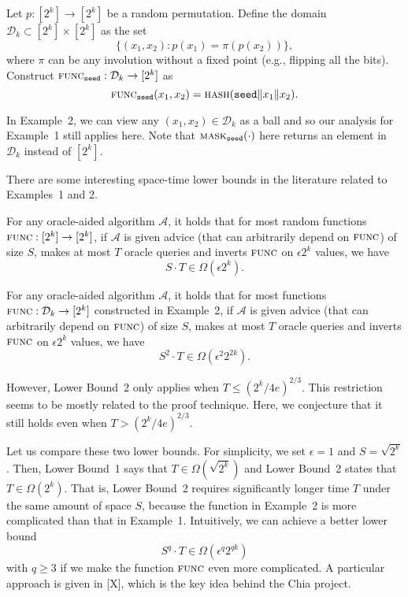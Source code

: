 \documentclass[12pt, onecolumn]{IEEEtran}
\newcommand{\seed}{\texttt{seed}}
\newcommand{\mask}{\textsc{mask}}
\newcommand{\func}{\textsc{func}}
\newcommand{\hash}{\textsc{hash}}
\begin{document}

 Let $p: [2^k] \to [2^k]$ be a random permutation. Define the domain $\mathcal{D}_k \subset [2^k] \times [2^k]$ as the set 
\[
\{ (x_1, x_2) : p(x_1) = \pi\left( p(x_2) \right) \},
\]
where $\pi$ can be any involution without a fixed point (e.g., flipping all the bits).
Construct $\func_{\seed}: \mathcal{D}_k \to [2^k]$ as 
\[
\func_{\seed}(x_1, x_2) = \hash(\seed \| x_1 \| x_2).
\]

In Example~2, we can view any $(x_1, x_2) \in \mathcal{D}_k$ as a ball and so
our analysis for Example~1 still applies here. 
Note that $\mask_{\seed}(\cdot)$ here returns an element in $\mathcal{D}_k$ instead of $[2^k]$.

There are some interesting space-time lower bounds in the literature 
related to Examples~1 and 2. 

For any oracle-aided algorithm $\mathcal{A}$, it holds that for most random functions
$\func: [2^k] \to [2^k]$, if $\mathcal{A}$ is given advice (that can arbitrarily depend on $\func$)
of size $S$, makes at most $T$ oracle queries and inverts $\func$ on $\epsilon 2^k$ values, we have
\begin{equation}
    S \cdot T \in \Omega\left(\epsilon 2^k \right).
\end{equation}


For any oracle-aided algorithm $\mathcal{A}$, it holds that for most functions
$\func: \mathcal{D}_k \to [2^k]$ constructed in Example~2, if $\mathcal{A}$ is given advice (that can arbitrarily depend on $\func$)
of size $S$, makes at most $T$ oracle queries and inverts $\func$ on $\epsilon 2^k$ values, we have
\begin{equation}
    S^2 \cdot T \in \Omega\left(\epsilon^2 2^{2k} \right).
\end{equation}

However, Lower Bound~2 only applies when $T \le \left(2^k/4 e \right)^{2/3}$. This restriction seems to be mostly related to the proof technique. Here, we conjecture that it still holds even when $T > \left(2^k/4 e \right)^{2/3}$.

Let us compare these two lower bounds. For simplicity, we set $\epsilon = 1$ and $S = \sqrt{2^k}$. Then, Lower Bound~1 says that 
$T \in \Omega\left(\sqrt{2^k} \right)$ and Lower Bound~2 states that $T \in \Omega\left( 2^k \right)$.
That is, Lower Bound~2 requires significantly longer time $T$ under the same amount of space $S$, because the function in Example~2 is more complicated than that in Example~1.
Intuitively, we can achieve a better lower bound 
\[
S^q \cdot T \in \Omega\left(\epsilon^q 2^{qk} \right)
\]
with $q \ge 3$ if we make the function $\func$ even more complicated. A particular approach is given in [X], which is the key idea behind the Chia project.
\end{document}
